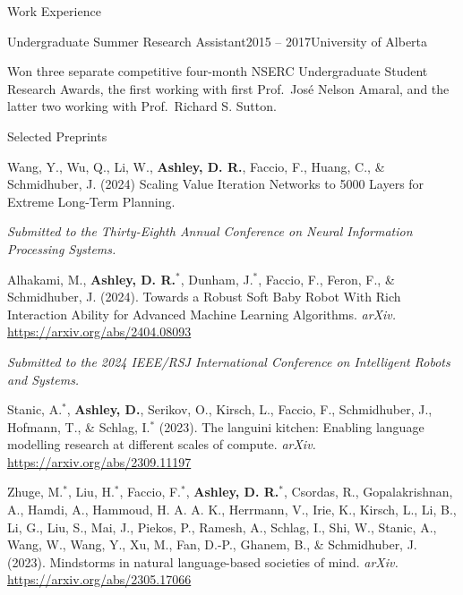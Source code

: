 \documentclass{cv}
\begin{document}
\begin{rSection}{Work Experience}
\begin{rSubsection}{Undergraduate Summer Research Assistant}{2015 -- 2017}{University of Alberta}
    \item Won three separate competitive four-month NSERC Undergraduate Student Research Awards, the first working with first Prof.\ Jos{\'{e}} Nelson Amaral, and the latter two working with Prof.\ Richard S. Sutton.
\end{rSubsection}

\end{rSection}


\begin{rSection}{Selected Preprints}

\begin{rPublications}
    \item
        Wang, Y., Wu, Q., Li, W., \textbf{Ashley, D. R.}, Faccio, F., Huang, C., \& Schmidhuber, J.
        (2024)
        Scaling Value Iteration Networks to 5000 Layers for Extreme Long-Term Planning.

        \vspace{-0.25em} \textit{Submitted to the Thirty-Eighth Annual Conference on Neural Information Processing Systems.}
    \item
        Alhakami, M., \textbf{Ashley, D. R.}$^*$, Dunham, J.$^*$, Faccio, F., Feron, F., \& Schmidhuber, J.
        (2024).
        Towards a Robust Soft Baby Robot With Rich Interaction Ability for Advanced Machine Learning Algorithms.
        \textit{arXiv.}
        \url{https://arxiv.org/abs/2404.08093}

        \vspace{-0.25em} \textit{Submitted to the 2024 {IEEE/RSJ} International Conference on Intelligent Robots and Systems.}
    \item
        Stanic, A.$^*$, \textbf{Ashley, D.}, Serikov, O., Kirsch, L., Faccio, F., Schmidhuber, J., Hofmann, T., \& Schlag, I.$^*$
        (2023).
        The languini kitchen: Enabling language modelling research at different scales of compute.
        \textit{arXiv.}
        \url{https://arxiv.org/abs/2309.11197}
    \item
        Zhuge, M.$^*$, Liu, H.$^*$, Faccio, F.$^*$, \textbf{Ashley, D. R.}$^*$, Csordas, R., Gopalakrishnan, A., Hamdi, A., Hammoud, H. A. A. K., Herrmann, V., Irie, K., Kirsch, L., Li, B., Li, G., Liu, S., Mai, J., Piekos, P., Ramesh, A., Schlag, I., Shi, W., Stanic, A., Wang, W., Wang, Y., Xu, M., Fan, D.-P., Ghanem, B., \& Schmidhuber, J.
        (2023).
        Mindstorms in natural language-based societies of mind.
        \textit{arXiv.}
        \url{https://arxiv.org/abs/2305.17066}


\end{rPublications}
\end{rSection}
\end{document}
